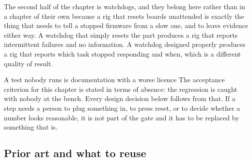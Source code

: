 The second half of the chapter is watchdogs, and they belong here rather than in
a chapter of their own because a rig that resets boards unattended is exactly
the thing that needs to tell a stopped firmware from a slow one, and to leave
evidence either way. A watchdog that simply resets the part produces a rig that
reports intermittent failures and no information. A watchdog designed properly
produces a rig that reports which task stopped responding and when, which is a
different quality of result.

\begin{note}{A test nobody runs is documentation with a worse licence}
The acceptance criterion for this chapter is stated in terms of absence: the
regression is caught with nobody at the bench. Every design decision below
follows from that. If a step needs a person to plug something in, to press
reset, or to decide whether a number looks reasonable, it is not part of the
gate and it has to be replaced by something that is.
\end{note}

\subsection*{Prior art and what to reuse}


